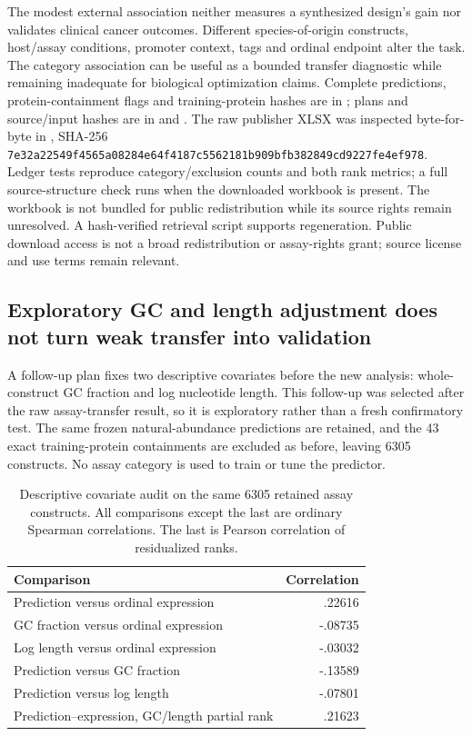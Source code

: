 The modest external association neither measures a synthesized design's gain nor validates clinical cancer outcomes. Different species-of-origin constructs, host/assay conditions, promoter context, tags and ordinal endpoint alter the task. The category association can be useful as a bounded transfer diagnostic while remaining inadequate for biological optimization claims. Complete predictions, protein-containment flags and training-protein hashes are in ; plans and source/input hashes are in  and . The raw publisher XLSX was inspected byte-for-byte in , SHA-256 \texttt{7e32a22549f4565a08284e64f4187c5562181b909bfb382849cd9227fe4ef978}. Ledger tests reproduce category/exclusion counts and both rank metrics; a full source-structure check runs when the downloaded workbook is present. The workbook is not bundled for public redistribution while its source rights remain unresolved. A hash-verified retrieval script supports regeneration. Public download access is not a broad redistribution or assay-rights grant; source license and use terms remain relevant.

\subsection{Exploratory GC and length adjustment does not turn weak transfer into validation}
A follow-up plan fixes two descriptive covariates before the new analysis: whole-construct GC fraction and log nucleotide length. This follow-up was selected after the raw assay-transfer result, so it is exploratory rather than a fresh confirmatory test. The same frozen natural-abundance predictions are retained, and the 43 exact training-protein containments are excluded as before, leaving 6305 constructs. No assay category is used to train or tune the predictor.
\begin{table}[ht]\centering
\caption{Descriptive covariate audit on the same 6305 retained assay constructs. All comparisons except the last are ordinary Spearman correlations. The last is Pearson correlation of residualized ranks.}
\begin{tabular}{lr}\hline
Comparison & Correlation\\\hline
Prediction versus ordinal expression & .22616\\
GC fraction versus ordinal expression & -.08735\\
Log length versus ordinal expression & -.03032\\
Prediction versus GC fraction & -.13589\\
Prediction versus log length & -.07801\\
Prediction--expression, GC/length partial rank & .21623\\\hline
\end{tabular}\end{table}


